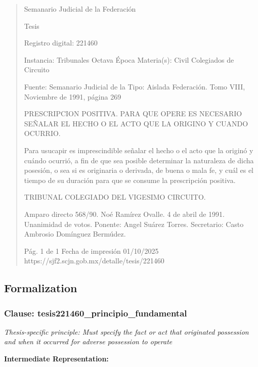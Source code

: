 \documentclass[11pt,a4paper]{article}
\begin{document}
\begin{quote}
                                                   Semanario Judicial de la Federación

                                                  Tesis

 Registro digital: 221460

 Instancia: Tribunales            Octava Época                         Materia(s): Civil
 Colegiados de Circuito

                                  Fuente: Semanario Judicial de la     Tipo: Aislada
                                  Federación.
                                  Tomo VIII, Noviembre de 1991,
                                  página 269


PRESCRIPCION POSITIVA. PARA QUE OPERE ES NECESARIO SEÑALAR EL HECHO O EL
ACTO QUE LA ORIGINO Y CUANDO OCURRIO.


Para usucapir es imprescindible señalar el hecho o el acto que la originó y cuándo ocurrió, a fin de
que sea posible determinar la naturaleza de dicha posesión, o sea si es originaria o derivada, de
buena o mala fe, y cuál es el tiempo de su duración para que se consume la prescripción positiva.

TRIBUNAL COLEGIADO DEL VIGESIMO CIRCUITO.


Amparo directo 568/90. Noé Ramírez Ovalle. 4 de abril de 1991. Unanimidad de votos. Ponente:
Angel Suárez Torres. Secretario: Casto Ambrosio Domínguez Bermúdez.




                                             Pág. 1 de 1             Fecha de impresión 01/10/2025
  https://sjf2.scjn.gob.mx/detalle/tesis/221460

\end{quote}

\subsection{Formalization}

\subsubsection{Clause: tesis221460\_principio\_fundamental}

\textit{Thesis-specific principle: Must specify the fact or act that originated possession and when it occurred for adverse possession to operate}

\textbf{Intermediate Representation:}
\end{document}
